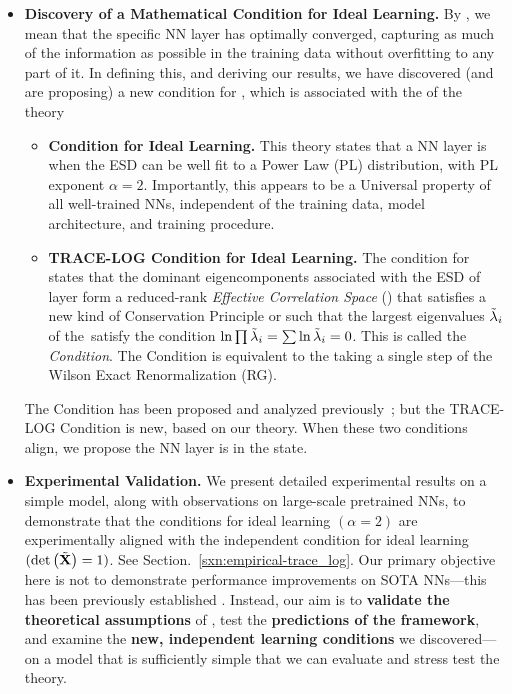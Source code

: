 \begin{itemize}
   \item 
     \textbf{Discovery of a Mathematical Condition for Ideal Learning.}
     By \IdealLearning, we mean that the specific NN layer has optimally converged, capturing as
     much of the information as possible in the training data without overfitting to any part of it.
     In defining this, and deriving our results, we have discovered (and are proposing) a new condition
     for \IdealLearning, which is associated with the \Universality of the \HTSR theory
   \begin{itemize}
      \item 
        \textbf{\HTSR Condition for Ideal Learning.}
        This \HTSR theory states that a NN layer is \Ideal  when the ESD can be well fit to a
        Power Law (PL) distribution, with PL exponent $\alpha = 2$. Importantly, 
        this appears to be a Universal property of all well-trained NNs, independent of the training data,
        model architecture, and training procedure.
      \item 
        \textbf{\SETOL TRACE-LOG Condition  for Ideal Learning.}
        The \SETOL condition for \IdealLearning states that the 
        dominant eigencomponents associated with the ESD 
        of layer form a reduced-rank \emph{Effective Correlation Space} (\ECS) that satisfies
        a new kind of Conservation Principle
        or \emph{\VolumePreservingTransformation} such that the largest eigenvalues $\tilde{\lambda}_{i}$ of the~\ECS satisfy
        the condition  $\ln \prod \tilde{\lambda}_{i} = \sum \ln \tilde{\lambda}_{i} = 0$.  
        This is called the \emph{\TRACELOG Condition}.  The \TRACELOG Condition is equivalent to the taking a single step of the Wilson Exact Renormalization (RG).
   \end{itemize}

   The \HTSR Condition has been proposed and analyzed previously~\cite{MM18_TR_JMLRversion,MM20a_trends_NatComm,YTHx23_KDD}; but
   the TRACE-LOG Condition is new, based on our \SETOL theory.
   When these two conditions align, we propose the NN layer is in the \Ideal state.

   \item 
   \textbf{Experimental Validation.} 
   We present detailed experimental results on a simple model, along with observations on large-scale pretrained NNs, to demonstrate that the \HTSR conditions for ideal learning $(\alpha = 2)$ are experimentally aligned with the independent \SETOL condition for ideal learning
   $(\mbox{}{\text{det}}\left(\tilde{\mathbf{X}}\right)=1)$. 
   See Section.~\ref{sxn:empirical-trace_log}.
   Our primary objective here is not to demonstrate performance improvements on SOTA NNs---this has been previously established \cite{NEURIPS2023_CHM}. 
   Instead, our aim is to \textbf{validate the theoretical assumptions} of \SETOL, test the \textbf{predictions of the \SETOL framework}, and examine the \textbf{new, independent learning conditions} we discovered---on a model that is sufficiently simple that we can evaluate and stress test the theory.


\end{itemize}
